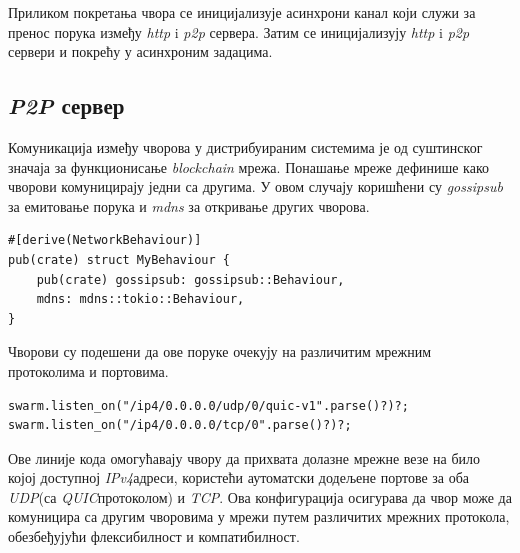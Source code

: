\documentclass[12pt, a4paper]{article}
\begin{document}
Приликом покретања чвора се иницијализује асинхрони канал који служи за пренос порука између \textit{http} i \textit{p2p} сервера. Затим се иницијализују \textit{http} i \textit{p2p} сервери и покрећу у асинхроним задацима.

\subsection{\textit{P2P} сервер}
Комуникација између чворова у дистрибуираним системима је од суштинског значаја за функционисање \textit{blockchain} мрежа.
Понашање мреже дефинише како чворови комуницирају једни са другима. У овом случају коришћени су \textit{gossipsub} за емитовање порука и \textit{mdns} за откривање других чворова.

\begin{verbatim}
#[derive(NetworkBehaviour)]
pub(crate) struct MyBehaviour {
    pub(crate) gossipsub: gossipsub::Behaviour,
    mdns: mdns::tokio::Behaviour,
}
\end{verbatim}

Чворови су подешени да ове поруке очекују на различитим мрежним протоколима и портовима.

\begin{verbatim}
swarm.listen_on("/ip4/0.0.0.0/udp/0/quic-v1".parse()?)?;
swarm.listen_on("/ip4/0.0.0.0/tcp/0".parse()?)?;
\end{verbatim}

\newpage
Ове линије кода омогућавају чвору да прихвата долазне мрежне везе на било којој доступној \textit{IPv4}\footnotemark[1] адреси, користећи аутоматски додељене портове за оба \textit{UDP}\footnotemark[2] (са \textit{QUIC}\footnotemark[3] протоколом) и \textit{TCP}\footnotemark[4]. Ова конфигурација осигурава да чвор може да комуницира са другим чворовима у мрежи путем различитих мрежних протокола, обезбеђујући флексибилност и компатибилност.



\end{document}
